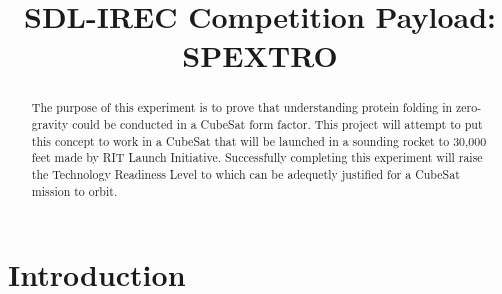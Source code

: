 \documentclass[conference]{IEEEtran} %
\title{SDL-IREC Competition Payload: SPEXTRO}
\author{
  \IEEEauthorblockN{%
    James~Parkus\IEEEauthorrefmark{1},  %
  }
  \IEEEauthorblockA{%
    RIT Space Exploration, Rochester Institute of Technology \\ %
    Rochester, N.Y. \\
    Email:
    \IEEEauthorrefmark{1}jep7631@rit.edu
  }

}
\begin{document}
\maketitle%

\begin{abstract}
The purpose of this experiment is to prove that understanding protein folding in zero-gravity could be conducted in a CubeSat form factor. This project will attempt to put this 
concept to work in a CubeSat that will be launched in a sounding rocket to 30,000 feet made by RIT Launch Initiative. Successfully completing this experiment will raise the Technology Readiness Level to which can be adequetly justified for a CubeSat mission to orbit.
\end{abstract}

\section{Introduction}
\label{sec:introduction}
\end{document}
